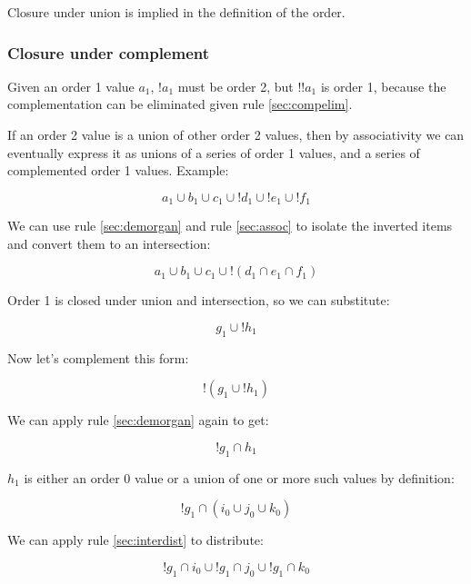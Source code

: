 \documentclass[letterpaper]{article}
\begin{document}
Closure under union is implied in the definition of the order.

\subsubsection{Closure under complement}

Given an order 1 value \(a_1\), \(!a_1\) must be order 2, but \(!!a_1\) is
order 1, because the complementation can be eliminated given rule
\ref{sec:compelim}.

If an order 2 value is a union of other order 2 values, then by associativity
we can eventually express it as unions of a series of order 1 values, and a
series of complemented order 1 values. Example:

\begin{equation}
a_1 \cup b_1 \cup c_1 \cup ! d_1 \cup ! e_1 \cup ! f_1
\end{equation}

We can use rule \ref{sec:demorgan} and rule \ref{sec:assoc} to isolate the
inverted items and convert them to an intersection:

\begin{equation}
a_1 \cup b_1 \cup c_1 \cup ! ( d_1 \cap  e_1 \cap  f_1 )
\end{equation}

Order 1 is closed under union and intersection, so we can substitute:

\begin{equation}
g_1 \cup ! h_1
\end{equation}

Now let's complement this form:

\begin{equation}
	! (g_1 \cup ! h_1)
\end{equation}

We can apply rule \ref{sec:demorgan} again to get:

\begin{equation}
	! g_1 \cap h_1
\end{equation}

\(h_1\) is either an order 0 value or a union of one or more such values by
definition:

\begin{equation}
	! g_1 \cap ( i_0 \cup j_0 \cup k_0 )
\end{equation}

We can apply rule \ref{sec:interdist} to distribute:

\begin{equation}
	!g_1 \cap i_0 \cup !g_1 \cap j_0 \cup !g_1 \cap k_0
\end{equation}
\end{document}
